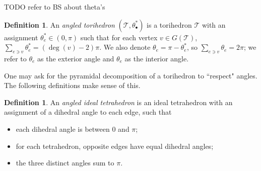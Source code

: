 \documentclass[11pt]{amsart}
\newcommand{\comment}[1]{}
\newcommand{\torus}{{\mathbb{T}^2}}
\newcommand{\sT}{{\mathcal{T}}}
\theoremstyle{plain}
\theoremstyle{definition}
\newtheorem{define}[theorem]{Definition}
\newtheorem{definition}[theorem]{Definition}
\newtheorem{remark}[theorem]{Remark}
\begin{document}
\comment{
\begin{remark}\label{cor:triangulation}
The faces of one torihedron which do not correspond to a bow-tie glue to a
corresponding face of the second torihedron to form bipyramids. One can add
stellating edges, edges which have vertices corresponding to the different
components of the Hopf link that cuts through the center of the face to
decompose the bipyramids into tetrahedra. This process is called {\it
stellation}. Stellating all the bipyramids of the decomposition obtained from
Proposition \ref{p:tori_decomp} we obtained a triangulation of the
complement of $L$ which is made up of {\it horizontal} edges (edges from the
graph of the torihedra), {\it vertical} edges (edges from coning vertices of the
the graph of the torihedra) and stellating edges.
\end{remark}
}

\comment{
\begin{proof}[Proof of Remark 2.7]
Using the decomposition from Proposition
\ref{p:tori_decomp} we can add a stellation edge whose end points
are $\torus \times \{-1\}$ and $\torus \times \{1\}$ which cut through faces of $\torus \times I$ which do not come from the augmentation disks like in \cite{CKP2}.
Since each face of the top torihedron gets glued to the bottom torihedron, we
obtain bipyramids, and the stellation edge will decompose the bipyramids into
tetrahedra. Then the link of the vertex  $\torus \times \{1\}$ or
$\torus \times \{-1\}$ is the graph of the torihedron
\end{proof}
}


TODO refer to BS about theta's
\begin{definition}
An \emph{angled torihedron} $(\sT, \theta_\bullet^*)$
is a torihedron $\sT$ with
an assignment $\theta_e^* \in (0,\pi)$
such that for each vertex $v \in G(\sT)$,
$\sum_{e \ni v} \theta_e^* = (\deg(v) - 2)\pi$.
We also denote $\theta_e = \pi - \theta_e^*$,
so $\sum_{e \ni v} \theta_e = 2\pi$;
we refer to $\theta_e$ as the exterior angle
and $\theta_e$ as the interior angle.
\end{definition}


One may ask for the pyramidal decomposition of a torihedron
to ``respect" angles. The following definitions make sense of this.

\begin{define}
An \emph{angled ideal tetrahedron} is an ideal tetrahedron with an assignment of a dihedral angle
to each edge, such that
\begin{itemize}
\item each dihedral angle is between 0 and $\pi$;
\item for each tetrahedron, opposite edges have equal dihedral angles;
\item the three distinct angles sum to $\pi$.
\end{itemize}
\end{define}
\end{document}

